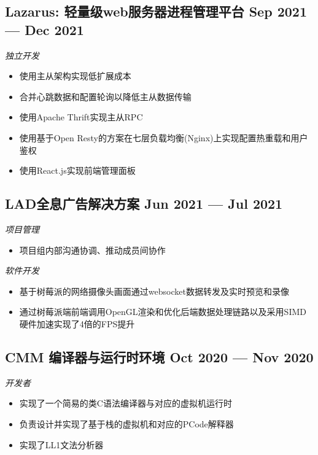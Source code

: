 \documentclass[a4,12pt]{article}
\newcommand{\subtext}[1]{
#1\par\vspace{-0.3cm}}
\newenvironment{zitemize}{
\begin{itemize}\itemsep0pt \parskip0pt \parsep1pt}
{\end{itemize}\vspace{-0.5cm}}
\begin{document}
\subsection*{Lazarus: {\normalsize\normalfont 轻量级web服务器进程管理平台} \hfill \textbf{Sep 2021 --- Dec 2021}}
\subtext{\textit{独立开发}}
\begin{zitemize}
    \item 使用主从架构实现低扩展成本
    \item 合并心跳数据和配置轮询以降低主从数据传输
    \item 使用Apache Thrift实现主从RPC
    \item 使用基于Open Resty的方案在七层负载均衡(Nginx)上实现配置热重载和用户鉴权
    \item 使用React.js实现前端管理面板
\end{zitemize}

\subsection*{LAD全息广告解决方案 \hfill \textbf{Jun 2021 --- Jul 2021}}
\subtext{\textit{项目管理}}
\begin{zitemize}
    \item 项目组内部沟通协调、推动成员间协作
\end{zitemize}

\vspace{0.3cm}
\subtext{\textit{软件开发}}
\begin{zitemize}
    \item 基于树莓派的网络摄像头画面通过websocket数据转发及实时预览和录像
    \item 通过树莓派端前端调用OpenGL渲染和优化后端数据处理链路以及采用SIMD硬件加速实现了4倍的FPS提升
    
\end{zitemize}

\subsection*{CMM 编译器与运行时环境 \hfill \textbf{Oct 2020 --- Nov 2020}}
\subtext{\textit{开发者}}
\begin{zitemize}
    \item 实现了一个简易的类C语法编译器与对应的虚拟机运行时 
    \item 负责设计并实现了基于栈的虚拟机和对应的PCode解释器
    \item 实现了LL1文法分析器
\end{zitemize}
\end{document}
